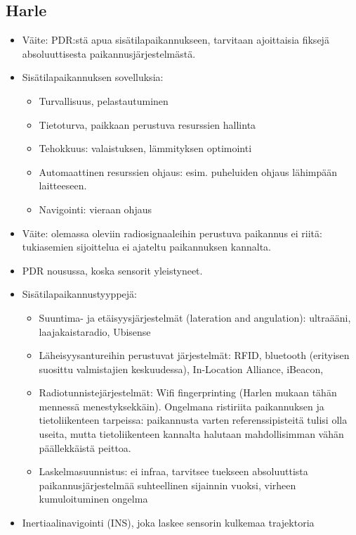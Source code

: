 \documentclass[a4paper]{scrartcl}
\begin{document}
\subsection{Harle \cite{harle2013survey}}
\begin{itemize}
  \item Väite: PDR:stä apua sisätilapaikannukseen, tarvitaan ajoittaisia fiksejä
    absoluuttisesta paikannusjärjestelmästä.
  \item Sisätilapaikannuksen sovelluksia:
    \begin{itemize}
      \item Turvallisuus, pelastautuminen
      \item Tietoturva, paikkaan perustuva resurssien hallinta
      \item Tehokkuus: valaistuksen, lämmityksen optimointi
      \item Automaattinen resurssien ohjaus: esim. puheluiden ohjaus
        lähimpään laitteeseen.
      \item Navigointi: vieraan ohjaus
    \end{itemize}
  \item Väite: olemassa oleviin radiosignaaleihin perustuva paikannus ei
    riitä: tukiasemien sijoittelua ei ajateltu paikannuksen kannalta.
  \item PDR nousussa, koska sensorit yleistyneet.
  \item Sisätilapaikannustyyppejä:
     \begin{itemize}
       \item Suuntima- ja etäisyysjärjestelmät (lateration and angulation):
         ultraääni, laajakaistaradio, Ubisense
       \item Läheisyysantureihin perustuvat järjestelmät: RFID, bluetooth
         (erityisen suosittu valmistajien keskuudessa),
         In-Location Alliance, iBeacon,
       \item Radiotunnistejärjestelmät: Wifi fingerprinting (Harlen mukaan
         tähän mennessä menestyksekkäin). Ongelmana ristiriita paikannuksen
         ja tietoliikenteen tarpeissa: paikannusta varten referenssipisteitä
         tulisi olla useita, mutta tietoliikenteen kannalta halutaan
         mahdollisimman vähän päällekkäistä peittoa.
       \item Laskelmasuunnistus: ei infraa, tarvitsee tuekseen absoluuttista
         paikannusjärjestelmää suhteellinen sijainnin vuoksi,
         virheen kumuloituminen ongelma
     \end{itemize}
   \item Inertiaalinavigointi (INS), joka laskee sensorin kulkemaa trajektoria

\end{itemize}
\end{document}
